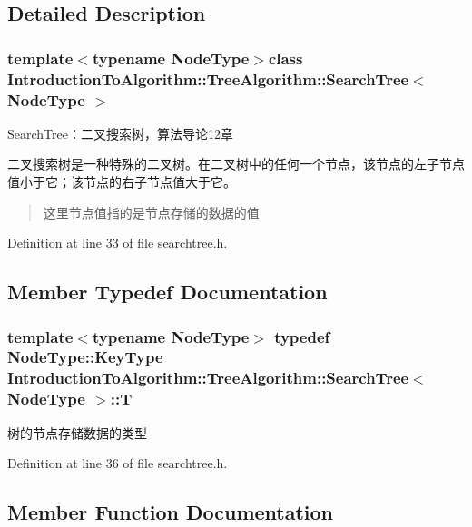 \subsection{Detailed Description}
\subsubsection*{template$<$typename Node\+Type$>$class Introduction\+To\+Algorithm\+::\+Tree\+Algorithm\+::\+Search\+Tree$<$ Node\+Type $>$}

Search\+Tree：二叉搜索树，算法导论12章 

二叉搜索树是一种特殊的二叉树。在二叉树中的任何一个节点，该节点的左子节点值小于它；该节点的右子节点值大于它。

\begin{quote}
这里节点值指的是节点存储的数据的值\end{quote}


Definition at line 33 of file searchtree.\+h.



\subsection{Member Typedef Documentation}
\hypertarget{class_introduction_to_algorithm_1_1_tree_algorithm_1_1_search_tree_a0a9b2de6326042f2a1fa8a3a0def67ab}{}
\subsubsection[{T}]{\setlength{\rightskip}{0pt plus 5cm}template$<$typename Node\+Type$>$ typedef Node\+Type\+::\+Key\+Type {\bf Introduction\+To\+Algorithm\+::\+Tree\+Algorithm\+::\+Search\+Tree}$<$ {\bf Node\+Type} $>$\+::{\bf T}}\label{class_introduction_to_algorithm_1_1_tree_algorithm_1_1_search_tree_a0a9b2de6326042f2a1fa8a3a0def67ab}
树的节点存储数据的类型 

Definition at line 36 of file searchtree.\+h.



\subsection{Member Function Documentation}
\hypertarget{class_introduction_to_algorithm_1_1_tree_algorithm_1_1_search_tree_a83724f0079d16419d4cceba74602cee1}{}
